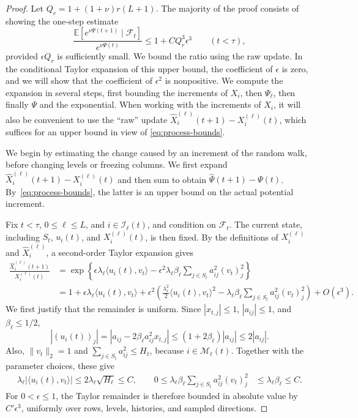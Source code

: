 \documentclass[reqno]{amsart}
\theoremstyle{definition}
\newcommand{\E}{\mathbb E}
\newcommand{\ip}[2]{\langle#1,#2\rangle}
\begin{document}
\begin{proof}
Let $Q_r=1+(1+\nu)r(L+1)$. The majority of the proof consists of showing the one-step estimate
\begin{equation}\label{eq:multiplicative} \frac{\E[e^{\nu\Psi(t+1)}\mid\mathcal F_t]} {e^{\nu\Psi(t)}} \le1+CQ_r^3\epsilon^3 \qquad(t<\tau), \end{equation}
provided $\epsilon Q_r$ is sufficiently small. We bound the ratio using the raw update. In the conditional Taylor expansion of this upper bound, the coefficient of $\epsilon$ is zero, and we will show that the coefficient of $\epsilon^2$ is nonpositive. We compute the expansion in several steps, first bounding the increments of $X_i$, then $\Psi_\ell$, then finally $\Psi$ and the exponential. When working with the increments of $X_i$, it will also be convenient to use the ``raw'' update $\widehat X_i^{(\ell)}(t+1)-X_i^{(\ell)}(t)$, which suffices for an upper bound in view of \eqref{eq:process-bounds}.

We begin by estimating the change caused by an increment of the random walk, before changing levels or freezing columns. We first expand $\widehat X_i^{(\ell)}(t+1)-X_i^{(\ell)}(t)$ and then sum to obtain $\widehat\Psi(t+1)-\Psi(t)$. By~\eqref{eq:process-bounds}, the latter is an upper bound on the actual potential increment.

Fix $t<\tau$, $0\le\ell\le L$, and $i\in\mathcal I_\ell(t)$, and condition on $\mathcal F_t$. The current state, including $S_t$, $u_i(t)$, and $X_i^{(\ell)}(t)$, is then fixed. By the definitions of $X_i^{(\ell)}$ and $\widehat X_i^{(\ell)}$, a second-order Taylor expansion gives
\begingroup
\begin{equation}\label{eq:row-expansion}
\begin{aligned}
  \frac{\widehat X_i^{(\ell)}(t+1)}{X_i^{(\ell)}(t)} &=\exp\left\{ \epsilon\lambda_\ell\ip{u_i(t)}{v_t} -\epsilon^2\lambda_\ell\beta_\ell \sum_{j\in S_t}a_{ij}^2(v_t)_j^2 \right\}\\
  &=1+\epsilon\lambda_\ell\ip{u_i(t)}{v_t} +\epsilon^2\left( \frac{\lambda_\ell^2}{2}\ip{u_i(t)}{v_t}^2 -\lambda_\ell\beta_\ell \sum_{j\in S_t}a_{ij}^2(v_t)_j^2 \right) +O(\epsilon^3).
\end{aligned}
\end{equation}
\endgroup
We first justify that the remainder is uniform. Since $|x_{t,j}|\le1$, $|a_{ij}|\le1$, and $\beta_\ell\le1/2$,
\[ |(u_i(t))_j| =|a_{ij}-2\beta_\ell a_{ij}^2x_{t,j}| \le(1+2\beta_\ell)|a_{ij}| \le2|a_{ij}|. \]
Also, $\|v_t\|_2=1$ and $\sum_{j\in S_t}a_{ij}^2\le H_\ell$, because $i\in\mathcal M_\ell(t)$. Together with the parameter choices, these give
\begin{equation}\label{eq:increment-bounds} \begin{aligned} \lambda_\ell|\ip{u_i(t)}{v_t}| \le2\lambda_\ell\sqrt{H_\ell}\le C, \qquad 0\le\lambda_\ell\beta_\ell \sum_{j\in S_t}a_{ij}^2(v_t)_j^2 &\le\lambda_\ell\beta_\ell\le C. \end{aligned} \end{equation}
For $0<\epsilon\le1$, the Taylor remainder is therefore bounded in absolute value by $C'\epsilon^3$, uniformly over rows, levels, histories, and sampled directions.


\end{proof}
\end{document}
